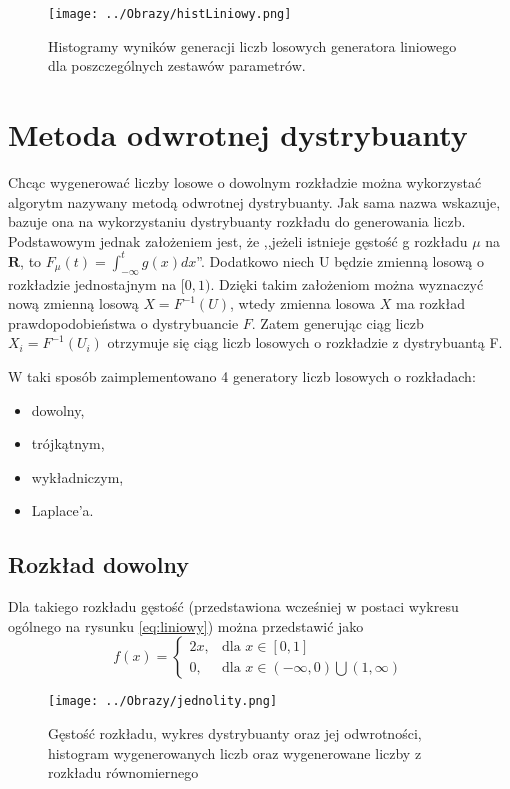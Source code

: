 \documentclass[12pt,a4paper]{article}
\begin{document}
\begin{figure}[H]
\centering
\texttt{[image: ../Obrazy/histLiniowy.png]} 
\caption{Histogramy wyników generacji liczb losowych generatora liniowego dla poszczególnych zestawów parametrów.}
\label{fig:histLiniowy}
\end{figure}


\section{Metoda odwrotnej dystrybuanty}
Chcąc wygenerować liczby losowe o dowolnym rozkładzie można wykorzystać algorytm nazywany metodą odwrotnej dystrybuanty.
Jak sama nazwa wskazuje, bazuje ona na wykorzystaniu dystrybuanty rozkładu do generowania liczb.
Podstawowym jednak założeniem jest, że ,,jeżeli istnieje gęstość g rozkładu $\mu$ na $\textbf{R}$, to $	F_{\mu}(t) = \int_{-\infty}^{t}g(x)dx $''\cite{wstep2001jakubowski}. 
Dodatkowo niech U będzie zmienną losową o rozkładzie jednostajnym na $[0,1)$.
Dzięki takim założeniom można wyznaczyć nową zmienną losową $X = F^{-1}(U)$, wtedy zmienna losowa $X$ ma rozkład prawdopodobieństwa o dystrybuancie $F$.
Zatem generując ciąg liczb $X_{i} = F^{-1}(U_{i})$ otrzymuje się ciąg liczb losowych o rozkładzie z dystrybuantą F.


\noindent
W taki sposób zaimplementowano 4 generatory liczb losowych o rozkładach:
\begin{itemize}
\item dowolny,
\item trójkątnym,
\item wykładniczym,
\item Laplace'a.
\end{itemize}


\subsection{Rozkład dowolny}
Dla takiego rozkładu gęstość (przedstawiona wcześniej w postaci wykresu ogólnego na rysunku \ref{eq:liniowy}) można przedstawić jako
\begin{equation}
f(x) = \begin{cases} 2x, & \mbox{dla } x \in [0,1] \\ 0, & \mbox{dla } x \in (-\infty,0) \bigcup (1,\infty) \end{cases}
\end{equation}

\begin{figure}[H]
\centering
\texttt{[image: ../Obrazy/jednolity.png]} 
\caption{Gęstość rozkładu, wykres dystrybuanty oraz jej odwrotności, histogram wygenerowanych liczb oraz wygenerowane liczby z rozkładu równomiernego}
\label{fig:jednorodnyL2}
\end{figure}
\end{document}

